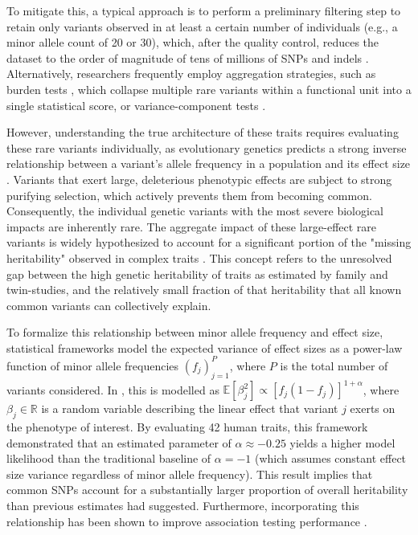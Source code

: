 To mitigate this, a typical approach is to perform a preliminary filtering step to retain only variants observed in at least a certain number of individuals (e.g., a minor allele count of 20 or 30), which, after the quality control, reduces the dataset to the order of magnitude of tens of millions of SNPs and indels \cite{Wainschtein2026}. Alternatively, researchers frequently employ aggregation strategies, such as burden tests \cite{weighted_sum_test}, which collapse multiple rare variants within a functional unit into a single statistical score, or variance-component tests \cite{SKAT}.

However, understanding the true architecture of these traits requires evaluating these rare variants individually, as evolutionary genetics predicts a strong inverse relationship between a variant's allele frequency in a population and its effect size \cite{Schoech2019}. Variants that exert large, deleterious phenotypic effects are subject to strong purifying selection, which actively prevents them from becoming common. Consequently, the individual genetic variants with the most severe biological impacts are inherently rare. The aggregate impact of these large-effect rare variants is widely hypothesized to account for a significant portion of the "missing heritability" observed in complex traits \cite{missingHeritability2009, Zuk2014,Wainschtein2026}. This concept refers to the unresolved gap between the high genetic heritability of traits as estimated by family and twin-studies, and the relatively small fraction of that heritability that all known common variants can collectively explain.

To formalize this relationship between minor allele frequency and effect size, statistical frameworks model the expected variance of effect sizes as a power-law function of minor allele frequencies $(f_j)_{j=1}^{P}$, where $P$ is the total number of variants considered. In \cite{speed2017reevaluation}, this is modelled as $\mathbb{E}[\beta_j^2] \propto [f_j(1-f_j)]^{1+\alpha}$, where $\beta_j \in \mathbb{R}$ is a random variable describing the linear effect that variant $j$ exerts on the phenotype of interest. By evaluating 42 human traits, this framework demonstrated that an estimated parameter of $\alpha \approx -0.25$ yields a higher model likelihood than the traditional baseline of $\alpha = -1$ (which assumes constant effect size variance regardless of minor allele frequency). This result implies that common SNPs account for a substantially larger proportion of overall heritability than previous estimates had suggested. Furthermore, incorporating this relationship has been shown to improve association testing performance \cite{hof2024ldak}.

